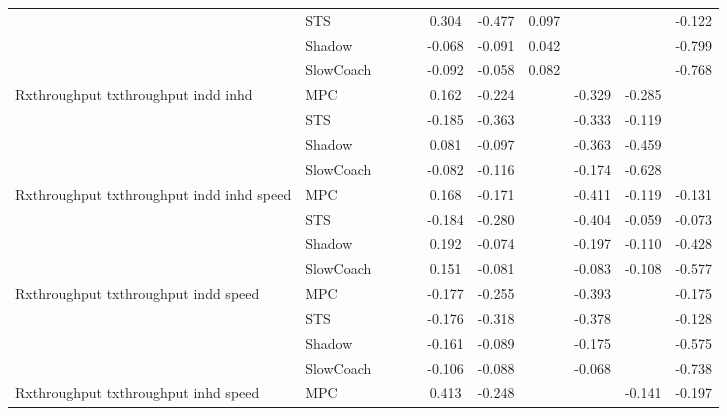 \begin{tabular}{|l|l|*{9}{c|}}
                              & STS &       &        &        &  0.304 & -0.477 &  0.097 &      &      &   -0.122 \\
                              & Shadow &       &        &        & -0.068 & -0.091 &  0.042 &      &      &   -0.799 \\
                              & SlowCoach &       &        &        & -0.092 & -0.058 &  0.082 &      &      &   -0.768 \\
\midrule
Rxthroughput txthroughput indd inhd    & MPC &       &        &        &  0.162 & -0.224 &     &  -0.329 &  -0.285 &       \\
                              & STS &       &        &        & -0.185 & -0.363 &     &  -0.333 &  -0.119 &       \\
                              & Shadow &       &        &        &  0.081 & -0.097 &     &  -0.363 &  -0.459 &       \\
                              & SlowCoach &       &        &        & -0.082 & -0.116 &     &  -0.174 &  -0.628 &       \\
\midrule
Rxthroughput txthroughput indd inhd speed    & MPC &       &        &        &  0.168 & -0.171 &     &  -0.411 &  -0.119 &   -0.131 \\
                              & STS &       &        &        & -0.184 & -0.280 &     &  -0.404 &  -0.059 &   -0.073 \\
                              & Shadow &       &        &        &  0.192 & -0.074 &     &  -0.197 &  -0.110 &   -0.428 \\
                              & SlowCoach &       &        &        &  0.151 & -0.081 &     &  -0.083 &  -0.108 &   -0.577 \\
\midrule
Rxthroughput txthroughput indd speed    & MPC &       &        &        & -0.177 & -0.255 &     &  -0.393 &      &   -0.175 \\
                              & STS &       &        &        & -0.176 & -0.318 &     &  -0.378 &      &   -0.128 \\
                              & Shadow &       &        &        & -0.161 & -0.089 &     &  -0.175 &      &   -0.575 \\
                              & SlowCoach &       &        &        & -0.106 & -0.088 &     &  -0.068 &      &   -0.738 \\
\midrule
Rxthroughput txthroughput inhd speed    & MPC &       &        &        &  0.413 & -0.248 &     &      &  -0.141 &   -0.197 \\

\end{tabular}
